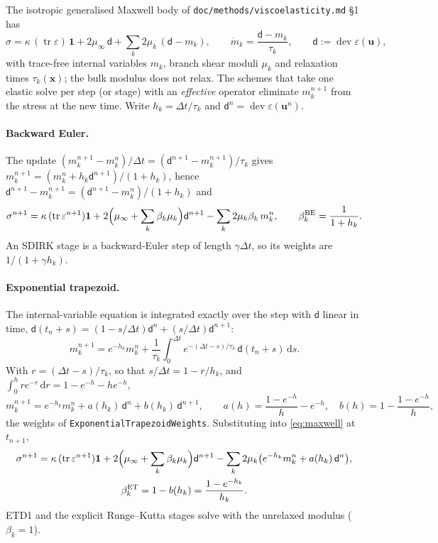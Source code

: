 \documentclass[11pt]{article}
\numberwithin{equation}{section}
\theoremstyle{remark}
\newcommand{\eps}{\varepsilon}
\newcommand{\tr}{\operatorname{tr}}
\newcommand{\dev}{\operatorname{dev}}
\newcommand{\vu}{\mathbf{u}}
\newcommand{\vx}{\mathbf{x}}
\newcommand{\one}{\mathbf{1}}
\newcommand{\code}[1]{\texttt{#1}}
\begin{document}
The isotropic generalised Maxwell body of \code{doc/methods/viscoelasticity.md}
\S1 has
\begin{equation}
  \sigma = \kappa\,(\tr\eps)\,\one + 2\mu_\infty\,\mathsf d
           + \sum_k 2\mu_k\,(\mathsf d - m_k),
  \qquad
  \dot m_k = \frac{\mathsf d - m_k}{\tau_k},
  \qquad \mathsf d := \dev\eps(\vu),
  \label{eq:maxwell}
\end{equation}
with trace-free internal variables $m_k$, branch shear moduli $\mu_k$ and
relaxation times $\tau_k(\vx)$; the bulk modulus does not relax. The
schemes that take one elastic solve per step (or stage) with an
\emph{effective} operator eliminate $m_k^{n+1}$ from the stress at the new
time. Write $h_k = \Delta t/\tau_k$ and $\mathsf d^n = \dev\eps(\vu^n)$.

\paragraph{Backward Euler.} The update $(m_k^{n+1} - m_k^n)/\Delta t =
(\mathsf d^{n+1} - m_k^{n+1})/\tau_k$ gives $m_k^{n+1} = (m_k^n + h_k
\mathsf d^{n+1})/(1+h_k)$, hence $\mathsf d^{n+1} - m_k^{n+1} =
(\mathsf d^{n+1} - m_k^n)/(1+h_k)$ and
\begin{equation}
  \sigma^{n+1} = \kappa\,(\tr\eps^{n+1})\one
   + 2\Bigl(\mu_\infty + \sum_k \beta_k \mu_k\Bigr)\mathsf d^{n+1}
   - \sum_k 2\mu_k \beta_k\, m_k^n,
  \qquad
  \beta_k^{\mathrm{BE}} = \frac{1}{1+h_k}.
  \label{eq:beta-be}
\end{equation}
An SDIRK stage is a backward-Euler step of length $\gamma\Delta t$, so its
weights are $1/(1+\gamma h_k)$.

\paragraph{Exponential trapezoid.} The internal-variable equation is
integrated exactly over the step with $\mathsf d$ linear in time,
$\mathsf d(t_n + s) = (1 - s/\Delta t)\mathsf d^n + (s/\Delta t)\mathsf
d^{n+1}$:
\[
  m_k^{n+1} = e^{-h_k} m_k^n
   + \frac{1}{\tau_k}\int_0^{\Delta t} e^{-(\Delta t - s)/\tau_k}\,
     \mathsf d(t_n + s)\,\mathrm{d}s .
\]
With $r = (\Delta t - s)/\tau_k$, so that $s/\Delta t = 1 - r/h_k$, and
$\int_0^h r e^{-r}\,\mathrm dr = 1 - e^{-h} - h e^{-h}$,
\[
  m_k^{n+1} = e^{-h_k} m_k^n + a(h_k)\,\mathsf d^n + b(h_k)\,\mathsf d^{n+1},
  \qquad
  a(h) = \frac{1 - e^{-h}}{h} - e^{-h},
  \quad
  b(h) = 1 - \frac{1 - e^{-h}}{h},
\]
the weights of \code{ExponentialTrapezoidWeights}. Substituting into
\eqref{eq:maxwell} at $t_{n+1}$,
\begin{equation}
\begin{gathered}
  \sigma^{n+1} = \kappa\,(\tr\eps^{n+1})\one
   + 2\Bigl(\mu_\infty + \sum_k \beta_k \mu_k\Bigr)\mathsf d^{n+1}
   - \sum_k 2\mu_k \bigl(e^{-h_k} m_k^n + a(h_k)\,\mathsf d^n\bigr),
  \\
  \beta_k^{\mathrm{ET}} = 1 - b(h_k) = \frac{1 - e^{-h_k}}{h_k}.
\end{gathered}
  \label{eq:beta-et}
\end{equation}
ETD1 and the explicit Runge--Kutta stages solve with the unrelaxed
modulus ($\beta_k = 1$).
\end{document}
